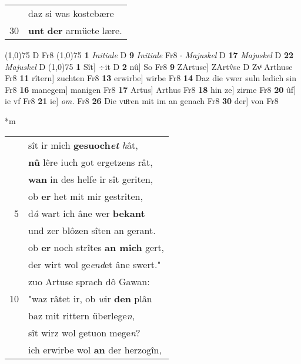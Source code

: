 \documentclass[8pt,a4paper,notitlepage]{article}
\begin{document}
\begin{table}[ht]
\begin{minipage}[t]{0.5\linewidth}
\begin{tabular}{rl}
 & daz si was kostebære\\ 
30 & \textbf{unt} \textbf{der} armüete lære.\\ 
\end{tabular}
\scriptsize
\line(1,0){75} \newline
D Fr8 \newline
\line(1,0){75} \newline
\textbf{1} \textit{Initiale} D  \textbf{9} \textit{Initiale} Fr8   $\cdot$ \textit{Majuskel} D  \textbf{17} \textit{Majuskel} D  \textbf{22} \textit{Majuskel} D  \newline
\line(1,0){75} \newline
\textbf{1} Sît] ÷it D \textbf{2} nû] So Fr8 \textbf{9} ZArtuse] ZArtv̂se D Zvͦ Arthuse Fr8 \textbf{11} rîtern] zuchten Fr8 \textbf{13} erwirbe] wirbe Fr8 \textbf{14} Daz die vwer suln ledich sin Fr8 \textbf{16} manegem] manigen Fr8 \textbf{17} Artus] Arthus Fr8 \textbf{18} hin ze] zirme Fr8 \textbf{20} ûf] ie vf Fr8 \textbf{21} ie] \textit{om.} Fr8 \textbf{26} Die vuͦren mit im an genach Fr8 \textbf{30} der] von Fr8 \newline
\end{minipage}
\hspace{0.5cm}
\begin{minipage}[t]{0.5\linewidth}
\small
\begin{center}*m
\end{center}
\begin{tabular}{rl}
 & sît ir mich \textbf{gesuoch\textit{et}} \textit{h}ât,\\ 
 & \textbf{nû} lêre iuch got ergetzens rât,\\ 
 & \textbf{wan} in des helfe ir sît geriten,\\ 
 & ob \textbf{er} het mit mir gestriten,\\ 
5 & d\textit{â} wart ich âne wer \textbf{bekant}\\ 
 & und zer blôzen sîten an gerant.\\ 
 & ob \textbf{er} noch strîtes \textbf{an mich} gert,\\ 
 & der wirt wol ge\textit{end}et âne swert."\\ 
 & zuo Artuse sprach dô Gawan:\\ 
10 & "waz râtet ir, ob \textit{w}ir \textbf{den} plân\\ 
 & baz mit rittern überlege\textit{n},\\ 
 & sît wirz wol getuon mege\textit{n}?\\ 
 & ich erwirbe wol \textbf{an} der herzogîn,\\ 

\end{tabular}
\end{minipage}
\end{table}
\end{document}
